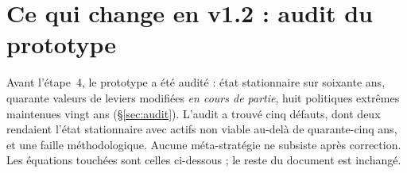 \documentclass[11pt,a4paper]{article}
\begin{document}
\section*{Ce qui change en v1.2 : audit du prototype}
Avant l'étape~4, le prototype a été audité : état stationnaire sur soixante ans, quarante valeurs de leviers modifiées \emph{en cours de partie}, huit politiques extrêmes maintenues vingt ans (\S\ref{sec:audit}). L'audit a trouvé cinq défauts, dont deux rendaient l'état stationnaire avec actifs non viable au-delà de quarante-cinq ans, et une faille méthodologique. Aucune méta-stratégie ne subsiste après correction. Les équations touchées sont celles ci-dessous ; le reste du document est inchangé.
\end{document}
